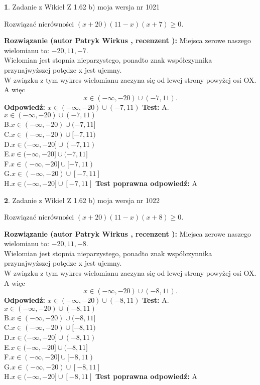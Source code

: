 \documentclass[12pt, a4paper]{article}
\theoremstyle{definition} %
\newtheorem{zad}{}
\newcommand{\zadStart}[1]{\begin{zad}#1\newline}
\newcommand{\zadStop}{\end{zad}}
\newcommand{\rozwStart}[2]{\noindent \textbf{Rozwiązanie (autor #1 , recenzent #2): }\newline}
\newcommand{\rozwStop}{\newline}
\newcommand{\odpStart}{\noindent \textbf{Odpowiedź:}\newline}
\newcommand{\odpStop}{\newline}
\newcommand{\testStart}{\noindent \textbf{Test:}\newline}
\newcommand{\testStop}{\newline}
\newcommand{\kluczStart}{\noindent \textbf{Test poprawna odpowiedź:}\newline}
\newcommand{\kluczStop}{\newline}
\begin{document}
\zadStart{Zadanie z Wikieł Z 1.62 b) moja wersja nr 1021}

Rozwiązać nierówności $(x+20)(11-x)(x+7)\ge0$.
\zadStop
\rozwStart{Patryk Wirkus}{}
Miejsca zerowe naszego wielomianu to: $-20, 11, -7$.\\
Wielomian jest stopnia nieparzystego, ponadto znak współczynnika przy\linebreak najwyższej potędze x jest ujemny.\\ W związku z tym wykres wielomianu zaczyna się od lewej strony powyżej osi OX. A więc $$x \in (-\infty,-20) \cup (-7,11).$$
\rozwStop
\odpStart
$x \in (-\infty,-20) \cup (-7,11)$
\odpStop
\testStart
A.$x \in (-\infty,-20) \cup (-7,11)$\\
B.$x \in (-\infty,-20) \cup (-7,11]$\\
C.$x \in (-\infty,-20) \cup [-7,11)$\\
D.$x \in (-\infty,-20] \cup (-7,11)$\\
E.$x \in (-\infty,-20] \cup (-7,11]$\\
F.$x \in (-\infty,-20] \cup [-7,11)$\\
G.$x \in (-\infty,-20) \cup [-7,11]$\\
H.$x \in (-\infty,-20] \cup [-7,11]$
\testStop
\kluczStart
A
\kluczStop



\zadStart{Zadanie z Wikieł Z 1.62 b) moja wersja nr 1022}

Rozwiązać nierówności $(x+20)(11-x)(x+8)\ge0$.
\zadStop
\rozwStart{Patryk Wirkus}{}
Miejsca zerowe naszego wielomianu to: $-20, 11, -8$.\\
Wielomian jest stopnia nieparzystego, ponadto znak współczynnika przy\linebreak najwyższej potędze x jest ujemny.\\ W związku z tym wykres wielomianu zaczyna się od lewej strony powyżej osi OX. A więc $$x \in (-\infty,-20) \cup (-8,11).$$
\rozwStop
\odpStart
$x \in (-\infty,-20) \cup (-8,11)$
\odpStop
\testStart
A.$x \in (-\infty,-20) \cup (-8,11)$\\
B.$x \in (-\infty,-20) \cup (-8,11]$\\
C.$x \in (-\infty,-20) \cup [-8,11)$\\
D.$x \in (-\infty,-20] \cup (-8,11)$\\
E.$x \in (-\infty,-20] \cup (-8,11]$\\
F.$x \in (-\infty,-20] \cup [-8,11)$\\
G.$x \in (-\infty,-20) \cup [-8,11]$\\
H.$x \in (-\infty,-20] \cup [-8,11]$
\testStop
\kluczStart
A
\kluczStop
\end{document}
